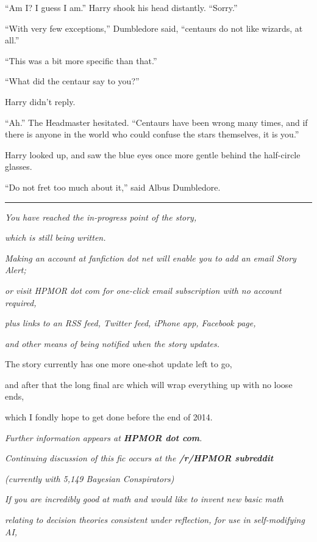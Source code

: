 ``Am I? I guess I am.'' Harry shook his head distantly. ``Sorry.''

``With very few exceptions,'' Dumbledore said, ``centaurs do not like
wizards, at all.''

``This was a bit more specific than that.''

``What did the centaur say to you?''

Harry didn't reply.

``Ah.'' The Headmaster hesitated. ``Centaurs have been wrong many times,
and if there is anyone in the world who could confuse the stars
themselves, it is you.''

Harry looked up, and saw the blue eyes once more gentle behind the
half-circle glasses.

``Do not fret too much about it,'' said Albus Dumbledore.

\begin{center}\rule{3in}{0.4pt}\end{center}

\emph{You have reached the in-progress point of the story,}

\emph{which is still being written.}

\emph{Making an account at fanfiction dot net will enable you to add an
email Story Alert;}

\emph{or visit HPMOR dot com for one-click email subscription with no
account required,}

\emph{plus links to an RSS feed, Twitter feed, iPhone app, Facebook
page,}

\emph{and other means of being notified when the story updates.}

The story currently has one more one-shot update left to go,

and after that the long final arc which will wrap everything up with no
loose ends,

which I fondly hope to get done before the end of 2014.

\emph{Further information appears at \textbf{HPMOR dot com}.}

\emph{Continuing discussion of this fic occurs at the \textbf{/r/HPMOR
subreddit}}

\emph{(currently with 5,149 Bayesian Conspirators)}

\emph{If you are incredibly good at math and would like to invent new
basic math}

\emph{relating to decision theories consistent under reflection, for use
in self-modifying AI,}

